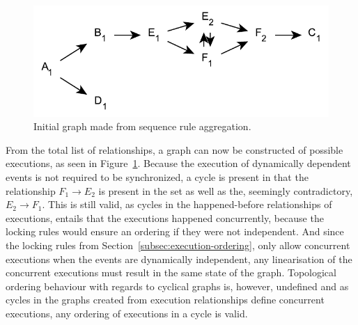 \documentclass{article}
\begin{document}
	\begin{figure}[ht!]
		\center
		\includegraphics[scale=0.6]{figures/dcr-graphs/execution-sequence-graph-example.pdf}
		\caption{Initial graph made from sequence rule aggregation.}
		\label{fig:execution-sequence-graph-example}
	\end{figure}
    \FloatBarrier

	From the total list of relationships, a graph can now be constructed of possible executions, as seen in Figure~\ref{fig:execution-sequence-graph-example}.
	Because the execution of dynamically dependent events is not required to be synchronized, a cycle is present in that the relationship $F_1 \rightarrow E_2$ is present in the set as well as the, seemingly contradictory, $E_2 \rightarrow F_1$.
	This is still valid, as cycles in the happened-before relationships of executions, entails that the executions happened concurrently, because the locking rules would ensure an ordering if they were not independent.
	And since the locking rules from Section~\ref{subsec:execution-ordering}, only allow concurrent executions when the events are dynamically independent, any linearisation of the concurrent executions must result in the same state of the graph.
	Topological ordering behaviour with regards to cyclical graphs is, however, undefined and as cycles in the graphs created from execution relationships define concurrent executions, any ordering of executions in a cycle is valid.
\end{document}
